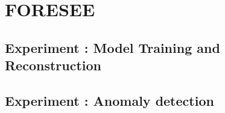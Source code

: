 \section{FORESEE}
\label{disc:foresee}

\subsection{Experiment : Model Training and Reconstruction}

\subsection{Experiment : Anomaly detection}